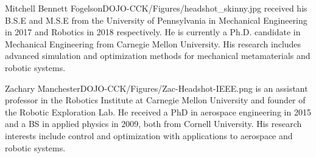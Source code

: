 \documentclass[twocolumn,letterpaper]{IEEEAerospaceCLS}  %
\begin{document}
% 





% 
% 
\begin{biographywithpic}
    {Mitchell Bennett Fogelson}{DOJO-CCK/Figures/headshot_skinny.jpg} received his B.S.E and M.S.E from the University of Pennsylvania in Mechanical Engineering in 2017 and Robotics in 2018 respectively. He is currently a Ph.D. candidate in Mechanical Engineering from Carnegie Mellon University. His research includes advanced simulation and optimization methods for mechanical metamaterials and robotic systems.
\end{biographywithpic} 


\begin{biographywithpic}
    {Zachary Manchester}{DOJO-CCK/Figures/Zac-Headshot-IEEE.png} %
    is an assistant professor in the Robotics Institute at Carnegie Mellon University and founder of the Robotic Exploration Lab. He received a PhD in aerospace engineering in 2015 and a BS in applied physics in 2009, both from Cornell University. His research interests include control and optimization with applications to aerospace and robotic systems. 
\end{biographywithpic}
\end{document}
